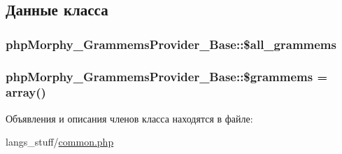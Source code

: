 \subsection{Данные класса}
\hypertarget{classphpMorphy__GrammemsProvider__Base_a58f8f14aaff698f825fba5dca34160b3}{
\subsubsection[{\$all\_\-grammems}]{\setlength{\rightskip}{0pt plus 5cm}phpMorphy\_\-GrammemsProvider\_\-Base::\$all\_\-grammems}}
\label{classphpMorphy__GrammemsProvider__Base_a58f8f14aaff698f825fba5dca34160b3}
\hypertarget{classphpMorphy__GrammemsProvider__Base_affb971c76497ef7774314d0087421460}{
\subsubsection[{\$grammems}]{\setlength{\rightskip}{0pt plus 5cm}phpMorphy\_\-GrammemsProvider\_\-Base::\$grammems = array()}}
\label{classphpMorphy__GrammemsProvider__Base_affb971c76497ef7774314d0087421460}


Объявления и описания членов класса находятся в файле:\begin{DoxyCompactItemize}
\item 
langs\_\-stuff/\hyperlink{langs__stuff_2common_8php}{common.php}\end{DoxyCompactItemize}
